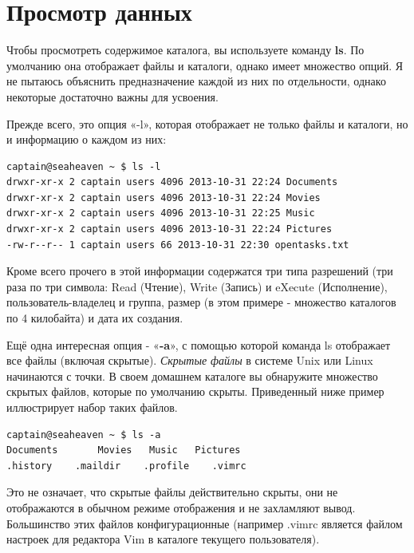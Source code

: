 \documentclass[10pt]{book}
\begin{document}
\section{Просмотр данных}

Чтобы просмотреть содержимое каталога, вы используете команду \textbf{ls}. По умолчанию она отображает файлы и каталоги, однако имеет множество опций. Я не пытаюсь объяснить предназначение каждой из них по отдельности, однако некоторые достаточно важны для усвоения.

Прежде всего, это опция «-l», которая отображает не только файлы и каталоги, но и информацию о каждом из них:

\vspace{3mm}
\begin{tcolorbox}
\begin{lstlisting}
captain@seaheaven ~ $ ls -l
drwxr-xr-x 2 captain users 4096 2013-10-31 22:24 Documents
drwxr-xr-x 2 captain users 4096 2013-10-31 22:24 Movies
drwxr-xr-x 2 captain users 4096 2013-10-31 22:25 Music
drwxr-xr-x 2 captain users 4096 2013-10-31 22:24 Pictures
-rw-r--r-- 1 captain users 66 2013-10-31 22:30 opentasks.txt
\end{lstlisting}
\end{tcolorbox}

Кроме всего прочего в этой информации содержатся три типа разрешений (три раза по три символа: Read (Чтение), Write (Запись) и eXecute (Исполнение), пользо\-ватель-владелец и группа, размер (в этом примере - множество каталогов по 4 килобайта) и дата их создания.

Ещё одна интересная опция - «\textbf{-a}», с помощью которой команда ls отображает все файлы (включая скрытые). \emph{Скрытые файлы} в системе Unix или Linux начинаются с точки. В своем домашнем каталоге вы обнаружите множество скрытых файлов, которые по умолчанию скрыты. Приведенный ниже пример иллюстрирует набор таких файлов.

\vspace{3mm}
\begin{tcolorbox}
\begin{lstlisting}
captain@seaheaven ~ $ ls -a
Documents 		Movies	 Music	 Pictures
.history 	.maildir 	.profile 	.vimrc
\end{lstlisting}
\end{tcolorbox}

Это не означает, что скрытые файлы действительно скрыты, они не отображаются в обычном режиме отображения и не захламляют вывод. Большинство этих файлов конфигурационные (например .vimrc является файлом настроек для редактора Vim в каталоге текущего пользователя). 
\end{document}

